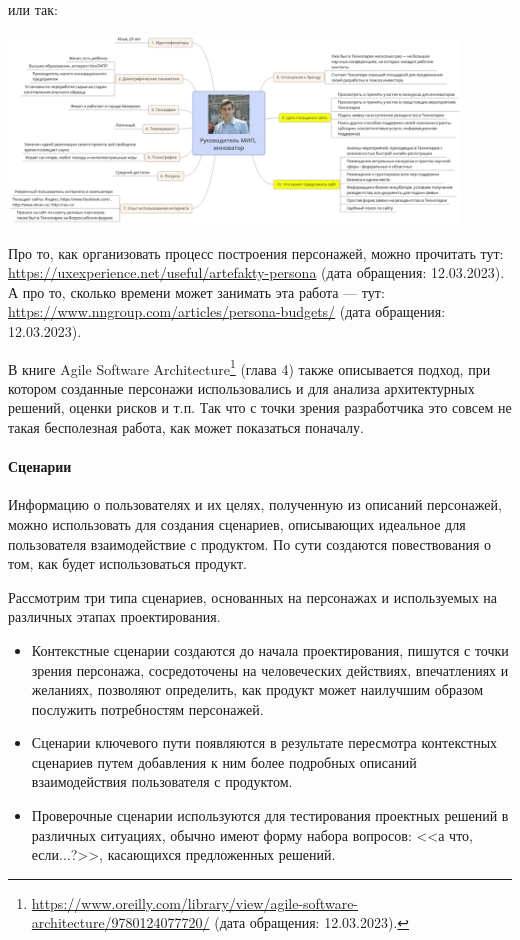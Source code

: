\documentclass{../../text-style}
\begin{document}
или так:

\begin{center}
    \includegraphics[width=0.9\textwidth]{ilya.png}
\end{center}

Про то, как организовать процесс построения персонажей, можно прочитать тут: \url{https://uxexperience.net/useful/artefakty-persona} (дата обращения: 12.03.2023). А про то, сколько времени может занимать эта работа --- тут: \url{https://www.nngroup.com/articles/persona-budgets/} (дата обращения: 12.03.2023).

В книге Agile Software Architecture\footnote{\url{https://www.oreilly.com/library/view/agile-software-architecture/9780124077720/} (дата обращения: 12.03.2023).} (глава 4) также описывается подход, при котором созданные персонажи использовались и для анализа архитектурных решений, оценки рисков и т.п. Так что с точки зрения разработчика это совсем не такая бесполезная работа, как может показаться поначалу.

\paragraph{Сценарии}

Информацию о пользователях и их целях, полученную из описаний персонажей, можно использовать для создания сценариев, описывающих идеальное для пользователя взаимодействие с продуктом. По сути создаются повествования о том, как будет использоваться продукт.

Рассмотрим три типа сценариев, основанных на персонажах и используемых на различных этапах проектирования.

\begin{itemize}
    \item Контекстные сценарии создаются до начала проектирования, пишутся с точки зрения персонажа, сосредоточены на человеческих действиях, впечатлениях и желаниях, позволяют определить, как продукт может наилучшим образом послужить потребностям персонажей.
    \item Сценарии ключевого пути появляются в результате пересмотра контекстных сценариев путем добавления к ним более подробных описаний взаимодействия пользователя с продуктом.
    \item Проверочные сценарии используются для тестирования проектных решений в различных ситуациях, обычно имеют форму набора вопросов: <<а что, если...?>>, касающихся предложенных решений.
\end{itemize}
\end{document}
